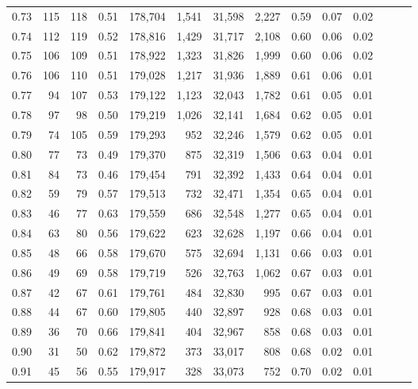 \begin{tabular}{rrrrrrrrrrrrrr}
0.73 &    115 &  118 &  0.51 &  178,704 &    1,541 &  31,598 &   2,227 &  0.59 &  0.07 &      0.02 \\
0.74 &    112 &  119 &  0.52 &  178,816 &    1,429 &  31,717 &   2,108 &  0.60 &  0.06 &      0.02 \\
0.75 &    106 &  109 &  0.51 &  178,922 &    1,323 &  31,826 &   1,999 &  0.60 &  0.06 &      0.02 \\
0.76 &    106 &  110 &  0.51 &  179,028 &    1,217 &  31,936 &   1,889 &  0.61 &  0.06 &      0.01 \\
0.77 &     94 &  107 &  0.53 &  179,122 &    1,123 &  32,043 &   1,782 &  0.61 &  0.05 &      0.01 \\
0.78 &     97 &   98 &  0.50 &  179,219 &    1,026 &  32,141 &   1,684 &  0.62 &  0.05 &      0.01 \\
0.79 &     74 &  105 &  0.59 &  179,293 &      952 &  32,246 &   1,579 &  0.62 &  0.05 &      0.01 \\
0.80 &     77 &   73 &  0.49 &  179,370 &      875 &  32,319 &   1,506 &  0.63 &  0.04 &      0.01 \\
0.81 &     84 &   73 &  0.46 &  179,454 &      791 &  32,392 &   1,433 &  0.64 &  0.04 &      0.01 \\
0.82 &     59 &   79 &  0.57 &  179,513 &      732 &  32,471 &   1,354 &  0.65 &  0.04 &      0.01 \\
0.83 &     46 &   77 &  0.63 &  179,559 &      686 &  32,548 &   1,277 &  0.65 &  0.04 &      0.01 \\
0.84 &     63 &   80 &  0.56 &  179,622 &      623 &  32,628 &   1,197 &  0.66 &  0.04 &      0.01 \\
0.85 &     48 &   66 &  0.58 &  179,670 &      575 &  32,694 &   1,131 &  0.66 &  0.03 &      0.01 \\
0.86 &     49 &   69 &  0.58 &  179,719 &      526 &  32,763 &   1,062 &  0.67 &  0.03 &      0.01 \\
0.87 &     42 &   67 &  0.61 &  179,761 &      484 &  32,830 &     995 &  0.67 &  0.03 &      0.01 \\
0.88 &     44 &   67 &  0.60 &  179,805 &      440 &  32,897 &     928 &  0.68 &  0.03 &      0.01 \\
0.89 &     36 &   70 &  0.66 &  179,841 &      404 &  32,967 &     858 &  0.68 &  0.03 &      0.01 \\
0.90 &     31 &   50 &  0.62 &  179,872 &      373 &  33,017 &     808 &  0.68 &  0.02 &      0.01 \\
0.91 &     45 &   56 &  0.55 &  179,917 &      328 &  33,073 &     752 &  0.70 &  0.02 &      0.01 \\

\end{tabular}
